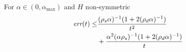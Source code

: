 \begin{theorem}
For $\alpha\in(0,\alpha_{\max})$ and $H$ non-symmetric
\begin{align}
\emph{err}(t)\leq &\frac{(\rho_s\alpha)^{-1}(1+2(\rho_d\alpha)^{-1})}{t^2}\nonumber\\&+\frac{\alpha^2(\alpha\rho_s)^{-1}(1+2(\rho_d\alpha)^{-1})}{t}
\end{align}
\end{theorem}
